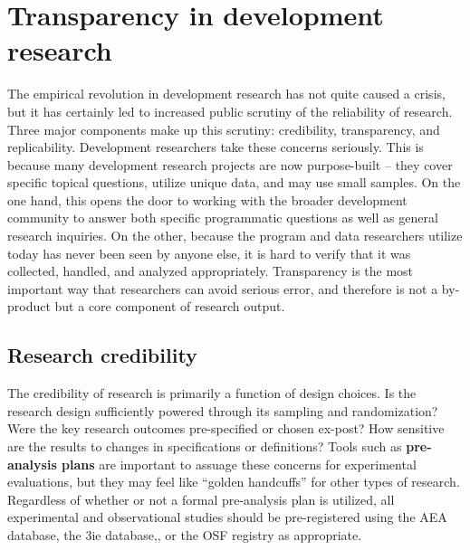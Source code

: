 
\section{Transparency in development research}

The empirical revolution in development research has not quite caused a crisis,
but it has certainly led to increased public scrutiny of the reliability of research.\cite{rogers_2017}
Three major components make up this scrutiny: credibility,\cite{ioannidis2017power} transparency,\cite{christensen2018transparency} and replicability.\cite{duvendack2017meant}
Development researchers take these concerns seriously.
This is because many development research projects are now purpose-built --
they cover specific topical questions, utilize unique data, and may use small samples.
On the one hand, this opens the door to working with the broader development community
to answer both specific programmatic questions as well as general research inquiries.
On the other, because the program and data researchers utilize today has never been seen by anyone else,
it is hard to verify that it was collected, handled, and analyzed appropriately.
Transparency is the most important way that researchers can avoid serious error,
and therefore is not a by-product but a core component of research output.

\subsection{Research credibility}

The credibility of research is primarily a function of design choices.\cite{ioannidis2005most}
Is the research design sufficiently powered through its sampling and randomization?
Were the key research outcomes pre-specified or chosen ex-post?
How sensitive are the results to changes in specifications or definitions?
Tools such as \textbf{pre-analysis plans} are important to assuage these concerns for experimental evaluations,
but they may feel like ``golden handcuffs'' for other types of research.\cite{olken2015promises}
Regardless of whether or not a formal pre-analysis plan is utilized,
all experimental and observational studies should be pre-registered
using the AEA database,
the 3ie database,,
or the OSF registry as appropriate.

